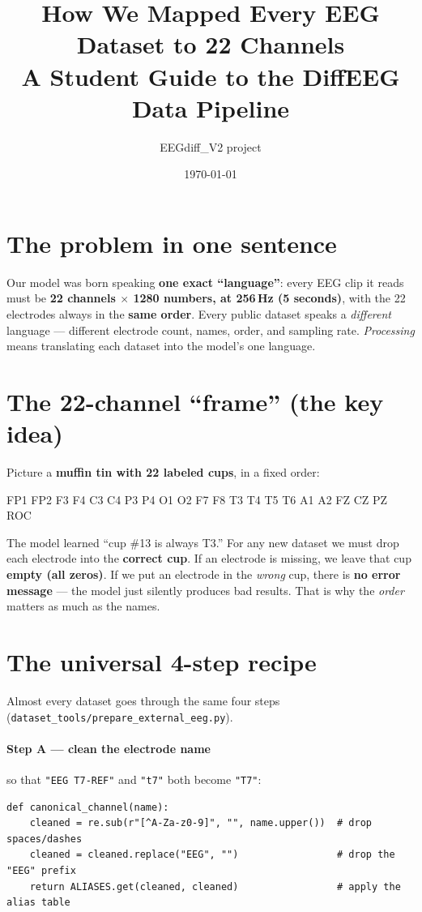 \documentclass[11pt]{article}
\title{\vspace{-1.5cm}\textbf{How We Mapped Every EEG Dataset to 22 Channels}\\[2pt]
\large A Student Guide to the DiffEEG Data Pipeline}
\author{EEGdiff\_V2 project}
\date{\today}
\begin{document}
\maketitle
\vspace{-0.6cm}

\section{The problem in one sentence}
Our model was born speaking \textbf{one exact ``language''}: every EEG clip it
reads must be \textbf{22 channels $\times$ 1280 numbers, at 256\,Hz (5 seconds)},
with the 22 electrodes always in the \textbf{same order}. Every public dataset
speaks a \emph{different} language --- different electrode count, names, order,
and sampling rate. \emph{Processing} means translating each dataset into the
model's one language.

\section{The 22-channel ``frame'' (the key idea)}
Picture a \textbf{muffin tin with 22 labeled cups}, in a fixed order:
\begin{center}\ttfamily\small
FP1 FP2 F3 F4 C3 C4 P3 P4 O1 O2 F7 F8 T3 T4 T5 T6 A1 A2 FZ CZ PZ ROC
\end{center}
The model learned ``cup \#13 is always T3.'' For any new dataset we must drop
each electrode into the \textbf{correct cup}. If an electrode is missing, we
leave that cup \textbf{empty (all zeros)}. If we put an electrode in the
\emph{wrong} cup, there is \textbf{no error message} --- the model just silently
produces bad results. That is why the \emph{order} matters as much as the names.

\section{The universal 4-step recipe}
Almost every dataset goes through the same four steps
(\texttt{dataset\_tools/prepare\_external\_eeg.py}).

\paragraph{Step A --- clean the electrode name} so that \texttt{"EEG T7-REF"}
and \texttt{"t7"} both become \texttt{"T7"}:
\begin{lstlisting}
def canonical_channel(name):
    cleaned = re.sub(r"[^A-Za-z0-9]", "", name.upper())  # drop spaces/dashes
    cleaned = cleaned.replace("EEG", "")                 # drop the "EEG" prefix
    return ALIASES.get(cleaned, cleaned)                 # apply the alias table
\end{lstlisting}
\end{document}
